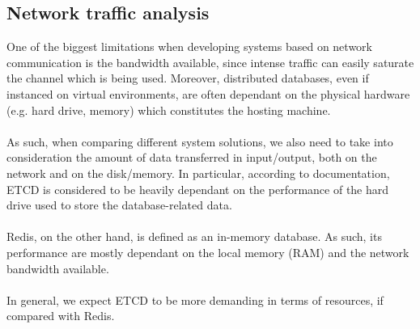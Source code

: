 \subsection{Network traffic analysis}\label{network-traffic-ex}
One of the biggest limitations when developing systems based on network communication is the bandwidth available, since intense traffic can easily saturate the channel which is being used. Moreover, distributed databases, even if instanced on virtual environments, are often dependant on the physical hardware (e.g. hard drive, memory) which constitutes the hosting machine. \\ \\
As such, when comparing different system solutions, we also need to take into consideration the amount of data transferred in input/output, both on the network and on the disk/memory. In particular, according to documentation, ETCD is considered to be heavily dependant on the performance of the hard drive used to store the database-related data. \\ \\
Redis, on the other hand, is defined as an in-memory database. As such, its performance are mostly dependant on the local memory (RAM) and the network bandwidth available. \\ \\
In general, we expect ETCD to be more demanding in terms of resources, if compared with Redis.

